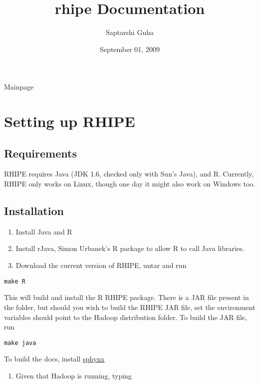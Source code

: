 \documentclass[letterpaper,10pt,english]{manual}
\title{rhipe Documentation}
\date{September 01, 2009}
\author{Saptarshi Guha}
\begin{document}
\maketitle
\tableofcontents



Mainpage

\resetcurrentobjects
\hypertarget{--doc-installation}{}

\chapter{Setting up RHIPE}


\section{Requirements}

RHIPE requires Java (JDK 1.6, checked only with Sun's Java), and R.
Currently, RHIPE only works on Linux, though one day it might also
work on Windows too.


\section{Installation}
\begin{enumerate}
\item {} 
Install Java and R

\item {} 
Install rJava, Simon Urbanek's R package to allow R to call Java libraries.

\item {} 
Download the current version of RHIPE, untar and run

\end{enumerate}

\begin{Verbatim}[commandchars=@\[\]]
make R
\end{Verbatim}

This will build and install the R RHIPE package. There is a JAR file
present in the  folder, but should you wish to build the RHIPE
JAR file, set the environment variables  should point to the
Hadoop distribution folder. To build the JAR file, run

\begin{Verbatim}[commandchars=@\[\]]
make java
\end{Verbatim}

To build the docs, install \href{http://sphinx.pocoo.org/}{sphynx}
\begin{enumerate}
\item {} 
Given that Hadoop is running, typing

\end{enumerate}
\end{document}
